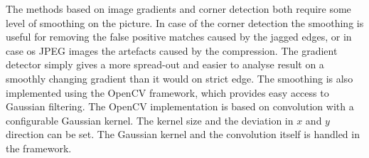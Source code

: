 The methods based on image gradients and corner detection both require some level of smoothing on the picture.
In case of the corner detection the smoothing is useful for removing the false positive matches caused by the jagged edges, or in case os JPEG images the artefacts caused by the compression.
The gradient detector simply gives a more spread-out and easier to analyse result on a smoothly changing gradient than it would on strict edge.
The smoothing is also implemented using the OpenCV framework, which provides easy access to Gaussian filtering.
The OpenCV implementation is based on convolution with a configurable Gaussian kernel.
The kernel size and the deviation in $x$ and $y$ direction can be set.
The Gaussian kernel and the convolution itself is handled in the framework.


